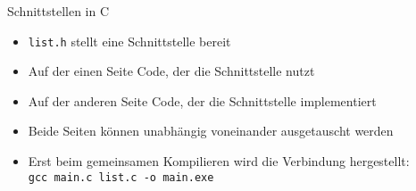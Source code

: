 \documentclass[10pt]{beamer} %
\begin{document}
\begin{frame}{Schnittstellen in C}

	\begin{itemize}
		\item \texttt{list.h} stellt eine Schnittstelle bereit
		\item Auf der einen Seite Code, der die Schnittstelle nutzt
		\item Auf der anderen Seite Code, der die Schnittstelle implementiert
		\item Beide Seiten können unabhängig voneinander ausgetauscht werden
		\item Erst beim gemeinsamen Kompilieren wird die Verbindung hergestellt:\\\texttt{gcc main.c list.c -o main.exe}
	\end{itemize}

\end{frame}


	
	\appendix
	\setcounter{finalframe}{\value{framenumber}}
	
	\setcounter{framenumber}{\value{finalframe}}
\end{document}
